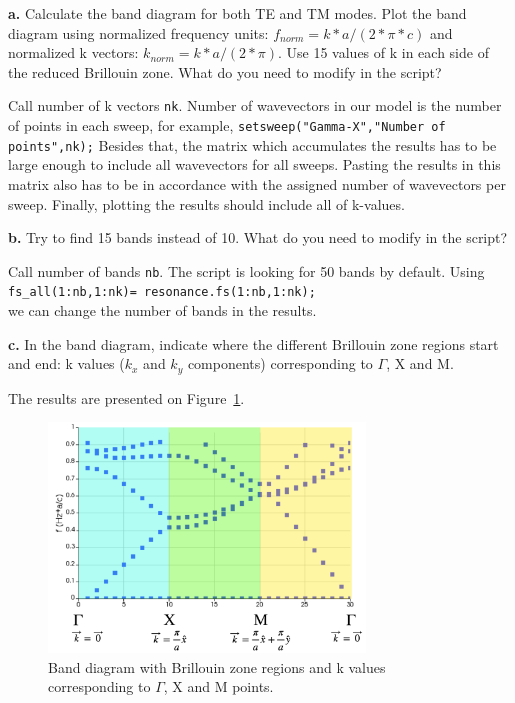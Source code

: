 \documentclass[11pt,a4paper]{article}
\begin{document}
\begin{displayquote}
    \textbf{a.} Calculate the band diagram for both TE and TM modes. Plot the band diagram using normalized frequency units: $f_{norm} = k * a / (2 * \pi * c)$ and normalized k vectors: $k_{norm} = k * a / (2 * \pi)$. Use 15 values of k in each side of the reduced Brillouin zone. What do you need to modify in the script? 
\end{displayquote}
Call number of k vectors \verb|nk|. Number of wavevectors in our model is the number of points in each sweep, for example, \verb|setsweep("Gamma-X","Number of points",nk);| Besides that, the matrix which accumulates the results has to be large enough to include all wavevectors for all sweeps. Pasting the results in this matrix also has to be in accordance with the assigned number of wavevectors per sweep. Finally, plotting the results should include all of k-values. 
\begin{displayquote}
    \textbf{b.} Try to find 15 bands instead of 10. What do you need to modify in the script? 
\end{displayquote}
Call number of bands \verb|nb|. The script is looking for 50 bands by default. Using \\ \verb|fs_all(1:nb,1:nk)= resonance.fs(1:nb,1:nk);| \\ we can change the number of bands in the results. 
\begin{displayquote}
    \textbf{c.} In the band diagram, indicate where the different Brillouin zone regions start and end: k values ($k_x$ and $k_y$ components) corresponding to $\Gamma$, X and M.
\end{displayquote}
The results are presented on Figure~\ref{fig:points}. 

\begin{figure}[ht]
   \centering
    \includegraphics[width=0.75\textwidth]{points.png}
    \caption{Band diagram with Brillouin zone regions and k values corresponding to $\Gamma$, X and M points.}
    \label{fig:points}
\end{figure}
\end{document}
